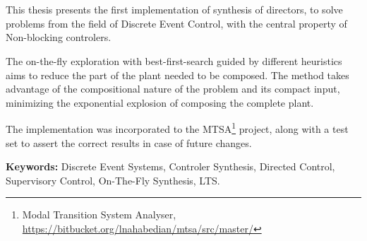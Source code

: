 \chapter*{\runtitle}

\noindent 

This thesis presents the first implementation of synthesis of directors, to solve problems from the field of Discrete Event Control, with the central property of Non-blocking controlers.

The on-the-fly exploration with best-first-search guided by different heuristics aims to reduce the part of the plant needed to be composed. The method takes advantage of the compositional nature of the problem and its compact input, minimizing the exponential explosion of composing the complete plant.

The implementation was incorporated to the MTSA\footnote{Modal Transition System Analyser, \href{https://bitbucket.org/lnahabedian/mtsa/src/master/^}{https://bitbucket.org/lnahabedian/mtsa/src/master/}} project, along with a test set to assert the correct results in case of future changes.

\bigskip

\noindent\textbf{Keywords:} Discrete Event Systems, Controler Synthesis, Directed Control, Supervisory Control, On-The-Fly Synthesis, LTS.